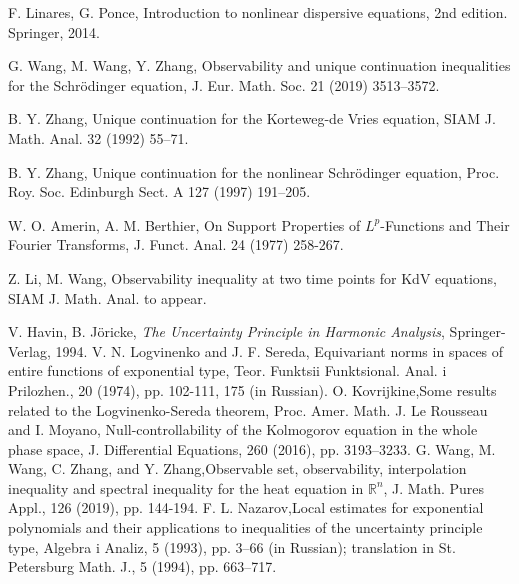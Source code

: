 \documentclass[12pt]{amsart}
\theoremstyle{definition}
\numberwithin{equation}{section}
\begin{document}
\begin{thebibliography}{999}

{\scriptsize


 

 F. Linares, G. Ponce, Introduction to nonlinear dispersive equations, 2nd edition. Springer, 2014.


   G. Wang, M. Wang, Y. Zhang, Observability and unique continuation inequalities for the Schr\"{o}dinger equation, J. Eur. Math. Soc.  21 (2019) 3513--3572.

 B. Y. Zhang,   Unique continuation for the Korteweg-de Vries equation, SIAM J. Math. Anal. 32 (1992)  55--71.

   B. Y. Zhang,   Unique continuation for the nonlinear Schr\"odinger equation, Proc. Roy. Soc. Edinburgh Sect. A 127 (1997)  191--205.

   W. O. Amerin, A. M. Berthier, On Support Properties of $L^p$-Functions and Their Fourier Transforms, J. Funct. Anal. 24 (1977) 258-267.
  }

   Z. Li, M. Wang, Observability inequality at two time points for KdV equations, SIAM J. Math. Anal. to appear.

   V. Havin, B. J\"{o}ricke, {\itshape The Uncertainty Principle in Harmonic Analysis}, Springer-Verlag, 1994.    
   V. N. Logvinenko and J. F. Sereda, Equivariant norms in spaces of entire functions of exponential type, Teor. Funktsii Funktsional. Anal. i Prilozhen.,  20 (1974), pp. 102-111, 175 (in Russian).
   O.  Kovrijkine,Some  results  related  to  the  Logvinenko-Sereda  theorem,  Proc.  Amer.  Math.
   J. Le Rousseau and I. Moyano, Null-controllability of the Kolmogorov equation in the whole phase space, J. Differential Equations, 260 (2016), pp. 3193--3233.
   G. Wang, M. Wang, C. Zhang, and Y. Zhang,Observable  set,  observability,  interpolation inequality  and  spectral  inequality  for  the  heat  equation  in $\mathbb{R}^{n}$, J. Math. Pures Appl., 126 (2019), pp. 144-194.
   F. L. Nazarov,Local estimates for exponential polynomials and their applications to inequalities  of  the  uncertainty  principle  type, Algebra i Analiz, 5 (1993), pp. 3--66 (in Russian); translation in St. Petersburg Math. J., 5 (1994), pp. 663--717.

\end{thebibliography}
\end{document}
